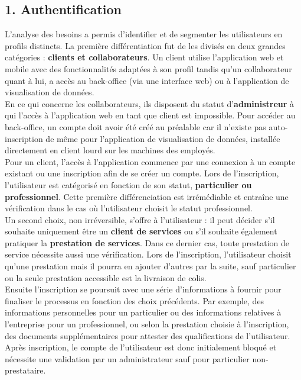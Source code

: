 \documentclass{report}
\begin{document}
\subsection*{1. Authentification}
\vspace{0.2cm}
\noindent L’analyse des besoins a permis d’identifier et de segmenter les utilisateurs en profils distincts. La première différentiation fut de les divisés en deux grandes catégories : \textbf{clients et collaborateurs}. Un client utilise l’application web et mobile avec des fonctionnalités adaptées à son profil tandis qu'un collaborateur quant à lui, a accès au back-office (via une interface web) ou à l’application de visualisation de données. \\

\noindent En ce qui concerne les collaborateurs, ils disposent du statut d'\textbf{administreur} à qui l'accès à l'application web en tant que client est impossible. Pour accéder au back-office, un compte doit avoir été créé au préalable car il n'existe pas auto-inscription de même pour l'application de visualisation de données, installée directement en client lourd sur les machines des employés. \\

\noindent Pour un client, l'accès à l'application commence par une connexion à un compte existant ou une inscription afin de se créer un compte. Lors de l'inscription, l'utilisateur est catégorisé en fonction de son statut, \textbf{particulier ou professionnel}. Cette première différenciation est irrémédiable et entraîne une vérification dans le cas où l'utilisateur choisit le statut professionnel. \\

\noindent Un second choix, non irréversible, s'offre à l'utilisateur : il peut décider s'il souhaite uniquement être un \textbf{client de services} ou s'il souhaite également pratiquer la \textbf{prestation de services}. Dans ce dernier cas, toute prestation de service nécessite aussi une vérification. Lors de l'inscription, l'utilisateur choisit qu'une prestation mais il pourra en ajouter d'autres par la suite, sauf particulier ou la seule prestation accessible est la livraison de colis. \\

\noindent Ensuite l'inscription se poursuit avec une série d'informations à fournir pour finaliser le processus en fonction des choix précédents. Par exemple, des informations personnelles pour un particulier ou des informations relatives à l'entreprise pour un professionnel, ou selon la prestation choisie à l'inscription, des documents supplémentaires pour attester des qualifications de l'utilisateur. Après inscription, le compte de l'utilisateur est donc initialement bloqué et nécessite une validation par un administrateur sauf pour particulier non-prestataire. \\
\end{document}

